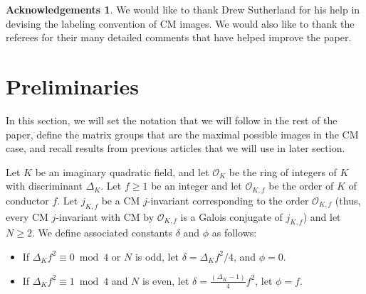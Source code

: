 \documentclass[11pt]{amsart}
\theoremstyle{definition}
\newtheorem*{ack}{Acknowledgements}
\newcommand{\OK}{\mathcal{O}_K}
\newcommand{\OO}{\mathcal{O}}
\begin{document}
\begin{ack}
    We would like to thank Drew Sutherland for his help in devising the labeling convention of CM images. We would also like to thank the referees for their many detailed comments that have helped improve the paper.
\end{ack}

\section{Preliminaries}\label{sec-preliminaries}

In this section, we will set the notation that we will follow in the rest of the paper, define the matrix groups that are the maximal possible images in the CM case, and recall results from previous articles that we will use in later section. 

Let $K$ be an imaginary quadratic field, and let $\OK$ be the ring of integers of $K$ with discriminant $\Delta_K$. Let $f\geq 1$ be an integer and let $\OO_{K,f}$ be the order of $K$ of conductor $f$. Let $j_{K,f}$ be a CM $j$-invariant corresponding to the order $\OO_{K,f}$ (thus, every CM $j$-invariant with CM by $\OO_{K,f}$ is a Galois conjugate of $j_{K,f}$) and let $N\geq 2$. We define associated constants $\delta$ and $\phi$ as follows:

\begin{itemize}
    \item If $\Delta_Kf^2\equiv 0\bmod 4$ or $N$ is odd, let $\delta=\Delta_K f^2/4$, and $\phi=0$.
	\item If $\Delta_Kf^2\equiv 1 \bmod 4$ and $N$ is even, let $\delta=\frac{(\Delta_K-1)}{4}f^2$, let $\phi=f$.
\end{itemize}
\end{document}
